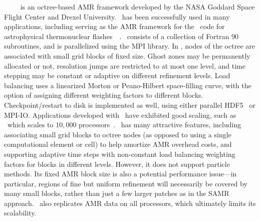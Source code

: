 \documentclass[11pt,letterpaper]{article}
\begin{document}
\SUBSUBSECTION{\paramesh}
%
\paramesh~\cite{MaOl00}~\cite{OlMa05}~\cite{Ol06}~\cite{wwwparamesh}
is an octree-based AMR framework developed by the NASA Goddard Space
Flight Center and Drexel University.  \paramesh\ has been successfully
used in many applications, including serving as the AMR framework for
the \flash\ code for astrophysical thermonuclear
flashes~\cite{FrOl00}~\cite{wwwflash}.  \paramesh\ consists of a
collection of Fortran 90 subroutines, and is parallelized using the
MPI library.
%
In \paramesh, nodes of the octree are associated with small grid
blocks of fixed size.  Ghost zones may be permanently allocated or
not, resolution jumps are restricted to at most one level, and time
stepping may be constant or adaptive on different refinement levels.
Load balancing uses a linearized Morton or Peano-Hilbert space-filling
curve, with the option of assigning different weighting factors to
different blocks.  Checkpoint/restart to disk is implemented as well,
using either parallel HDF5~\cite{hdf5} or MPI-IO.  Applications
developed with \paramesh\ have exhibited good scaling, such as \flash\
which scales to $10,000$ processors~\cite{Du09}.
%
%
\paramesh\ has many attractive features, including associating small
grid blocks to octree nodes (as opposed to using a single
computational element or cell) to help amortize AMR overhead costs,
and supporting adaptive time steps with non-constant load balancing
weighting factors for blocks in different levels.  However, it does
not support particle methods.  Its fixed AMR block size is also a
potential performance issue---in particular, regions of fine but
uniform refinement will necessarily be covered by many small blocks,
rather than just a few larger patches as in the SAMR approach.
\paramesh\ also replicates AMR data on all processors, which
ultimately limits its scalability.

\end{document}
